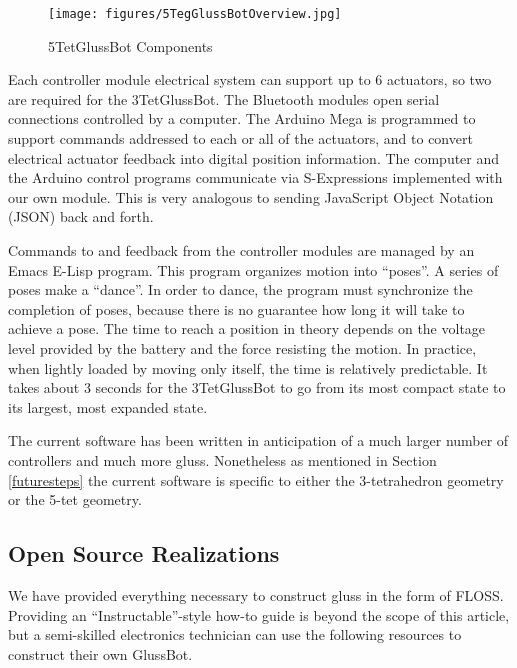 \documentclass[11pt]{article}
\begin{document}
\begin{figure}[H]
  \centering
    \texttt{[image: figures/5TegGlussBotOverview.jpg]}
    \caption[5TetGlussBot Components]{5TetGlussBot Components}
      \label{5TetGlussBot}
\end{figure}


Each controller module electrical system can support up to 6 actuators, so two are required for the 3TetGlussBot.
The Bluetooth modules open serial connections controlled by a computer.
The Arduino Mega is programmed to support commands addressed to each or all of the actuators, and
to convert electrical actuator feedback into digital position information.
The computer and the Arduino control programs communicate via S-Expressions
implemented with our own module. This is very analogous to sending JavaScript Object Notation (JSON) back and forth.

Commands to and feedback from the controller modules are managed by an Emacs E-Lisp program.
This program organizes motion into ``poses''. A series of poses make a ``dance''.
In order to dance, the program must synchronize the completion of poses, because there is no
guarantee how long it will take to achieve a pose. The time to reach a position in theory
depends on the voltage level provided by the battery and the force resisting the motion.
In practice, when lightly loaded by moving only itself, the time is relatively predictable. It takes
about 3 seconds for the 3TetGlussBot to go from its most compact state to its largest, most expanded state.

The current software has been written in anticipation of a much larger number of controllers and much more gluss.
Nonetheless as mentioned in Section \ref{futuresteps} the current software is specific to either the 3-tetrahedron geometry or the
5-tet geometry.


\subsection{Open Source Realizations}

We have provided everything necessary to construct gluss in the form of FLOSS. Providing an ``Instructable''-style
how-to guide is beyond the scope of this article, but a semi-skilled electronics technician can use the
following resources to construct their own GlussBot.
\end{document}
